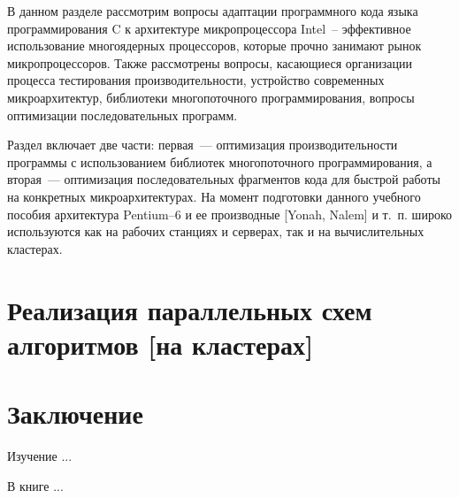 \documentclass[14pt, a4paper, openany, twoside, final]{extbook} %
\newcommand{\e}[2][fcolor]{\textcolor{pcolor}{[}\textcolor{#1}{#2}\textcolor{pcolor}{]}}
\begin{document}
В данном разделе рассмотрим вопросы адаптации программного кода языка программирования C к архитектуре микропроцессора Intel~-- эффективное использование многоядерных процессоров, которые прочно занимают рынок микропроцессоров.  Также рассмотрены вопросы, касающиеся организации процесса тестирования производительности, устройство современных микроархитектур, библиотеки многопоточного программирования, вопросы оптимизации последовательных программ.

Раздел включает две части: первая~--- оптимизация производительности программы с использованием библиотек многопоточного программирования, а вторая~--- оптимизация последовательных фрагментов кода для быстрой работы на конкретных микроархитектурах.   На момент подготовки данного учебного пособия архитектура Pentium--6 и ее производные \e{Yonah, Nalem} и т.~п. широко используются как на рабочих станциях и серверах, так и на вычислительных кластерах.



\chapter{Реализация параллельных схем алгоритмов \e{на кластерах}}

\chapter*{Заключение}


Изучение ...

В книге ...
\end{document}
